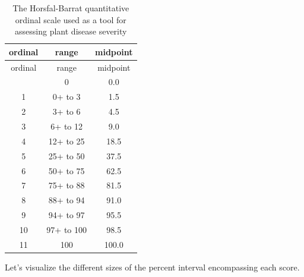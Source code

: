 \documentclass[
  letterpaper,
  DIV=11,
  numbers=noendperiod]{scrreprt}
\begin{document}
\hypertarget{tbl-HB}{}
\begin{longtable}[]{@{}ccc@{}}
\caption{\label{tbl-HB}The Horsfal-Barrat quantitative ordinal scale
used as a tool for assessing plant disease severity}\tabularnewline
\toprule\noalign{}
ordinal & range & midpoint \\
\midrule\noalign{}
\endfirsthead
\toprule\noalign{}
ordinal & range & midpoint \\
\midrule\noalign{}
\endhead
\bottomrule\noalign{}
\endlastfoot
0 & 0 & 0.0 \\
1 & 0+ to 3 & 1.5 \\
2 & 3+ to 6 & 4.5 \\
3 & 6+ to 12 & 9.0 \\
4 & 12+ to 25 & 18.5 \\
5 & 25+ to 50 & 37.5 \\
6 & 50+ to 75 & 62.5 \\
7 & 75+ to 88 & 81.5 \\
8 & 88+ to 94 & 91.0 \\
9 & 94+ to 97 & 95.5 \\
10 & 97+ to 100 & 98.5 \\
11 & 100 & 100.0 \\
\end{longtable}

Let's visualize the different sizes of the percent interval encompassing
each score.
\end{document}
